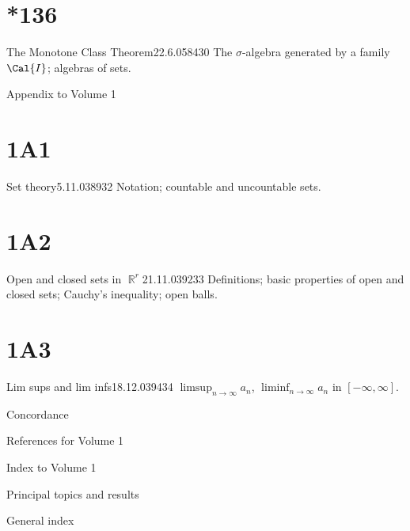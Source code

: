 \section{*136}{The Monotone Class Theorem}{22.6.05}{84}{30}
{The $\sigma$-algebra generated by a family $\Cal{I}$;
algebras of sets.}

\medskip

 Appendix to Volume 1


\section{1A1}{Set theory}{5.11.03}{89}{32}
{Notation;  countable and uncountable sets.}

\section{1A2}{Open and closed sets in $\BbbR^r$}{21.11.03}{92}{33}
{Definitions;  basic properties of open and closed sets;  Cauchy's
inequality;  open balls.}

\section{1A3}{Lim sups and lim infs}{18.12.03}{94}{34}
{$\limsup_{n\to\infty}a_n$, $\liminf_{n\to\infty}a_n$ in
$[-\infty,\infty]$.}


Concordance 

\medskip

References for Volume 1 

\medskip
     
Index to Volume 1
     
\qquad Principal topics and results 
     
\qquad General index 
     
